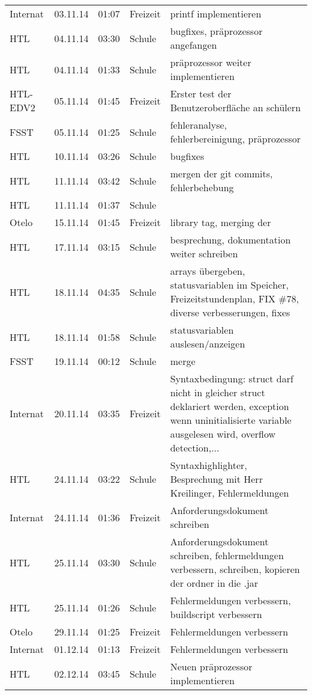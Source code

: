 \begin{small}
\begin{longtable}{ p{} p{} p{} p{} p{}}
Internat	& 03.11.14	& 01:07	& Freizeit	& printf implementieren \\
HTL	& 04.11.14	& 03:30	& Schule	& bugfixes, pr\"aprozessor angefangen \\
HTL	& 04.11.14	& 01:33	& Schule	& pr\"aprozessor weiter implementieren \\
HTL-EDV2	& 05.11.14	& 01:45	& Freizeit	& Erster test der Benutzeroberfl\"ache an sch\"ulern \\
FSST	& 05.11.14	& 01:25	& Schule	& fehleranalyse, fehlerbereinigung, pr\"aprozessor \\
HTL	& 10.11.14	& 03:26	& Schule	& bugfixes \\
HTL	& 11.11.14	& 03:42	& Schule	& mergen der git commits, fehlerbehebung \\
HTL	& 11.11.14	& 01:37	& Schule	&  \\
Otelo	& 15.11.14	& 01:45	& Freizeit	& library tag, merging der \\
HTL	& 17.11.14	& 03:15	& Schule	& besprechung, dokumentation weiter schreiben \\
HTL	& 18.11.14	& 04:35	& Schule	& arrays \"ubergeben, statusvariablen im Speicher, Freizeitstundenplan, FIX \#{}78, diverse verbesserungen, fixes \\
HTL	& 18.11.14	& 01:58	& Schule	& statusvariablen auslesen/anzeigen \\
FSST	& 19.11.14	& 00:12	& Schule	& merge \\
Internat	& 20.11.14	& 03:35	& Freizeit	& Syntaxbedingung: struct darf nicht in gleicher struct deklariert werden, exception wenn uninitialisierte variable ausgelesen wird, overflow detection,... \\
HTL	& 24.11.14	& 03:22	& Schule	& Syntaxhighlighter, Besprechung mit Herr Kreilinger, Fehlermeldungen \\
Internat	& 24.11.14	& 01:36	& Freizeit	& Anforderungsdokument schreiben \\
HTL	& 25.11.14	& 03:30	& Schule	& Anforderungsdokument schreiben, fehlermeldungen verbessern, schreiben, kopieren der ordner in die .jar \\
HTL	& 25.11.14	& 01:26	& Schule	& Fehlermeldungen verbessern, buildscript verbessern \\
Otelo	& 29.11.14	& 01:25	& Freizeit	& Fehlermeldungen verbessern \\
Internat	& 01.12.14	& 01:13	& Freizeit	& Fehlermeldungen verbessern \\
HTL	& 02.12.14	& 03:45	& Schule	& Neuen pr\"aprozessor implementieren \\

\end{longtable}
\end{small}
